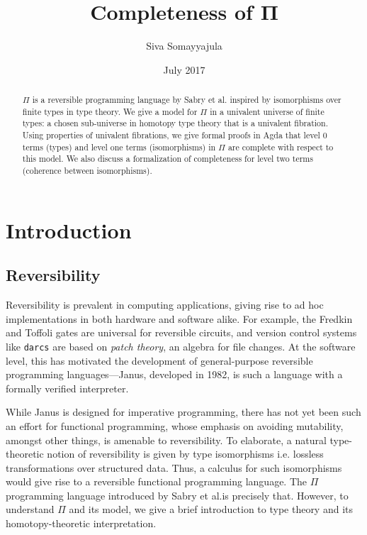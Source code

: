 \documentclass[12pt, letterpaper]{article}
\title{Completeness of Π}
\author{Siva Somayyajula}
\date{July 2017}
\theoremstyle{definition}
\begin{document}
\maketitle


\begin{abstract}
$\Pi$ is a reversible programming language by Sabry et al. inspired by isomorphisms over finite types in type theory. We give a model for $\Pi$ in a univalent universe of finite types: a chosen sub-universe in homotopy type theory that is a univalent fibration. Using properties of univalent fibrations, we give formal proofs in Agda that level 0 terms (types) and level one terms (isomorphisms) in $\Pi$ are complete with respect to this model. We also discuss a formalization of completeness for level two terms (coherence between isomorphisms).
\end{abstract}

\tableofcontents

\section{Introduction}

\subsection{Reversibility}

Reversibility is prevalent in computing applications, giving rise to ad hoc implementations in both hardware and software alike. For example, the Fredkin and Toffoli gates are universal for reversible circuits, and version control systems like \texttt{darcs} are based on \emph{patch theory}, an algebra for file changes. At the software level, this has motivated the development of general-purpose reversible programming languages---Janus, developed in 1982, is such a language with a formally verified interpreter.

While Janus is designed for imperative programming, there has not yet been such an effort for functional programming, whose emphasis on avoiding mutability, amongst other things, is amenable to reversibility. To elaborate, a natural type-theoretic notion of reversibility is given by type isomorphisms i.e. lossless transformations over structured data. Thus, a calculus for such isomorphisms would give rise to a reversible functional programming language. The $\Pi$ programming language introduced by Sabry et al.is precisely that. However, to understand $\Pi$ and its model, we give a brief introduction to type theory and its homotopy-theoretic interpretation.
\end{document}
